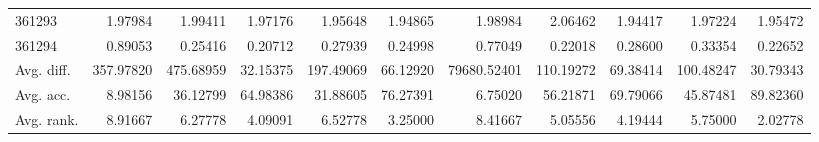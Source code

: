 \begin{tabular}{lrrrrrrrrrr}
361293 & 1.97984 & 1.99411 & 1.97176 & 1.95648 & 1.94865 & 1.98984 & 2.06462 & 1.94417 & 1.97224 & 1.95472 \\
361294 & 0.89053 & 0.25416 & 0.20712 & 0.27939 & 0.24998 & 0.77049 & 0.22018 & 0.28600 & 0.33354 & 0.22652 \\
Avg. diff. & 357.97820 & 475.68959 & 32.15375 & 197.49069 & 66.12920 & 79680.52401 & 110.19272 & 69.38414 & 100.48247 & 30.79343 \\
Avg. acc. & 8.98156 & 36.12799 & 64.98386 & 31.88605 & 76.27391 & 6.75020 & 56.21871 & 69.79066 & 45.87481 & 89.82360 \\
Avg. rank. & 8.91667 & 6.27778 & 4.09091 & 6.52778 & 3.25000 & 8.41667 & 5.05556 & 4.19444 & 5.75000 & 2.02778 \\
\bottomrule
\end{tabular}
